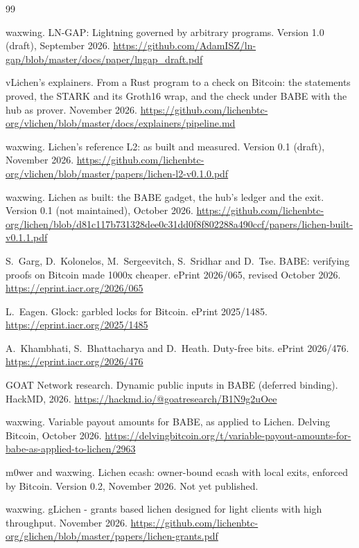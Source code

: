 \documentclass[11pt]{article}
\begin{document}
\begin{thebibliography}{99}

 waxwing. LN-GAP: Lightning governed by arbitrary programs. Version 1.0 (draft), September 2026. \url{https://github.com/AdamISZ/ln-gap/blob/master/docs/paper/lngap_draft.pdf}

 vLichen's explainers. From a Rust program to a check on Bitcoin: the statements proved, the STARK and its Groth16 wrap, and the check under BABE with the hub as prover. November 2026. \url{https://github.com/lichenbtc-org/vlichen/blob/master/docs/explainers/pipeline.md}

 waxwing. Lichen's reference L2: as built and measured. Version 0.1 (draft), November 2026. \url{https://github.com/lichenbtc-org/vlichen/blob/master/papers/lichen-l2-v0.1.0.pdf}

 waxwing. Lichen as built: the BABE gadget, the hub's ledger and the exit. Version 0.1 (not maintained), October 2026. \url{https://github.com/lichenbtc-org/lichen/blob/d81c117b731328dee0c31dd0f8f802288a490ccf/papers/lichen-built-v0.1.1.pdf}

 S.~Garg, D.~Kolonelos, M.~Sergeevitch, S.~Sridhar and D.~Tse. BABE: verifying proofs on Bitcoin made 1000x cheaper. ePrint 2026/065, revised October 2026. \url{https://eprint.iacr.org/2026/065}

 L.~Eagen. Glock: garbled locks for Bitcoin. ePrint 2025/1485. \url{https://eprint.iacr.org/2025/1485}

 A.~Khambhati, S.~Bhattacharya and D.~Heath. Duty-free bits. ePrint 2026/476. \url{https://eprint.iacr.org/2026/476}

 GOAT Network research. Dynamic public inputs in BABE (deferred binding). HackMD, 2026. \url{https://hackmd.io/@goatresearch/B1N9g2uOee}

 waxwing. Variable payout amounts for BABE, as applied to Lichen. Delving Bitcoin, October 2026. \url{https://delvingbitcoin.org/t/variable-payout-amounts-for-babe-as-applied-to-lichen/2963}

 m0wer and waxwing. Lichen ecash: owner-bound ecash with local exits, enforced by Bitcoin. Version 0.2, November 2026. Not yet published.

 waxwing. gLichen - grants based lichen designed for light clients with high throughput. November 2026. \url{https://github.com/lichenbtc-org/glichen/blob/master/papers/lichen-grants.pdf}


\end{thebibliography}
\end{document}

